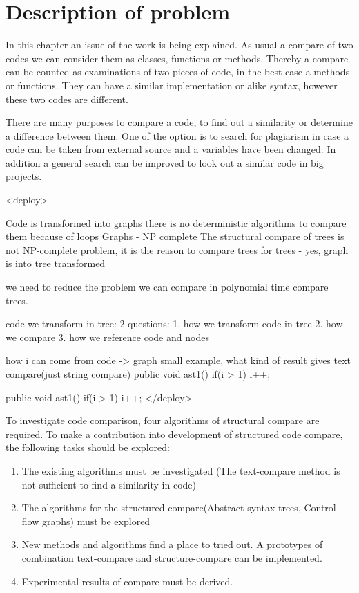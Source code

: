 \chapter{Description of problem}
\label{cha:Description}

In this chapter an issue of the work is being explained. As usual a compare of two codes we can consider them as classes, functions or methods. Thereby a compare can be counted as examinations of two pieces of code, in the best case a methods or functions. They can have a similar implementation or alike syntax, however these two codes are different.

There are many purposes to compare a code, to find out a similarity or determine a difference between them. One of the option is to search for plagiarism in case a code can be taken from external source and a variables have been changed. In addition a general search can be improved to look out a similar code in big projects.

<deploy>

Code is transformed into graphs
there is no deterministic algorithms to compare them because of loops
Graphs - NP complete
The structural compare of trees is not NP-complete problem, it is the reason to compare trees
for trees - yes, graph is into tree transformed

we need to reduce the problem
we can compare in polynomial time compare trees.

code we transform in tree:
2 questions:
 1. how we transform code in tree
 2. how we compare
 3. how we reference code and nodes
 
 how i can come from code -> graph
small example, what kind of  result gives text compare(just string compare)
 public void ast1(){
		if(i > 1) i++;
	}
	
	public void ast1(){
		if(i > 1) 
		i++;
	}
</deploy>

To investigate code comparison, four algorithms of structural compare are required.
To make a contribution into development of structured code compare, the following tasks should be explored:

\begin{enumerate}
  \item The existing algorithms must be investigated (The text-compare method is not sufficient to find a similarity in code)
  \item The algorithms for the structured compare(Abstract syntax trees, Control flow graphs) must be explored 
   \item New methods and algorithms find a place to tried out. A prototypes of combination text-compare and structure-compare can be implemented.
   \item Experimental results of compare must be derived.
\end{enumerate}

